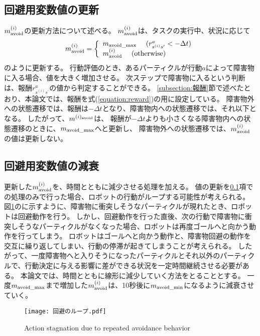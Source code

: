 \subsection{回避用変数値の更新} \label{subsection:回避用変数値の更新}
$m^{(i)}_{\rm avoid}$の更新方法について述べる。
$m^{(i)}_{\rm avoid}$は、タスクの実行中、状況に応じて
\begin{equation}
\label{equation:reward}
  m^{(i)}_{\rm avoid} =
  \left\{
    \begin{array}{l}
      m_{\rm avoid\_max} \ \ \ \ (r^{a}_{s^{(i)}s^{\prime}} < - \Delta t) \\
      m^{(i)}_{\rm avoid} \ \ \ \ ({\rm otherwise})
    \end{array}
  \right.
\end{equation}
のように更新する。
行動評価のとき、あるパーティクルが行動$a$によって障害物に入る場合、値を大きく増加させる。
次ステップで障害物に入るという判断は、報酬$r^{a}_{s^{(i)}s^{\prime}}$の値から判定することができる。
\ref{subsection:報酬}節で述べたとおり、本論文では、報酬を式(\ref{equation:reward})の用に設定している。
障害物外への状態遷移では、報酬は$-\Delta t$となり、障害物内への状態遷移では、それ以下となる。
したがって、$m^{(i)_{\rm avoid}}$は、
報酬が$-\Delta t$よりも小さくなる障害物内への状態遷移のときに、$m_{\rm avoid\_max}$へと更新し、
障害物外への状態遷移では、$m^{(i)}_{\rm avoid}$の値は更新しない。

\subsection{回避用変数値の減衰}
更新した$m^{(i)}_{\rm avoid}$を、時間とともに減少させる処理を加える。
値の更新を\ref{subsection:回避用変数値の更新}項での処理のみで行った場合、ロボットの行動がループする可能性が考えられる。
図\ref{fig:回避のループ}のに示すように、障害物に衝突しそうなパーティクルが現れたとき、ロボットは回避動作を行う。
しかし、回避動作を行った直後、次の行動で障害物に衝突しそうなパーティクルがなくなった場合、ロボットは再度ゴールへと向かう動作を行ってしまう。
ロボットはゴールへと向かう動作と、障害物回避の動作を交互に繰り返してしまい、行動の停滞が起きてしまうことが考えられる。
したがって、一度障害物へと入りそうになったパーティクルとそれ以外のパーティクルで、行動決定に与える影響に差ができる状況を一定時間継続させる必要がある。
本論文では、時間とともに線形に減少していく方法をとることとする。
一度$m_{\rm avoid\_max}$まで増加した$m^{(i)}_{\rm avoid}$は、10秒後に$m_{\rm avoid\_min}$になるように減衰させていく。

\begin{figure}[H]
  \begin{center}
    \texttt{[image: 回避のループ.pdf]}
    \caption{Action stagnation due to repeated avoidance behavior}
    \label{fig:回避のループ}
  \end{center}
\end{figure}
